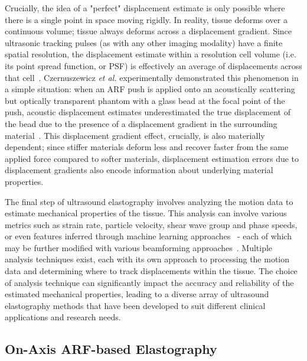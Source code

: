 Crucially, the idea of a "perfect" displacement estimate is only possible where there is a single point in space moving rigidly. In reality, tissue deforms over a continuous volume; tissue always deforms across a displacement gradient. Since ultrasonic tracking pulses (as with any other imaging modality) have a finite spatial resolution, the displacement estimate within a resolution cell volume (i.e. its point spread function, or PSF) is effectively an average of displacements across that cell~\cite{walker_fundamental_1995,mcaleavey_Estimates_2003,palmeri_Ultrasonic_2006}. Czernuszewicz \emph{et al.} experimentally demonstrated this phenomenon in a simple situation: when an ARF push is applied onto an acoustically scattering but optically transparent phantom with a glass bead at the focal point of the push, acoustic displacement estimates underestimated the true displacement of the bead due to the presence of a displacement gradient in the surrounding material~\cite{czernuszewicz_Experimental_2013}. This displacement gradient effect, crucially, is also materially dependent; since stiffer materials deform less and recover faster from the same applied force compared to softer materials, displacement estimation errors due to displacement gradients also encode information about underlying material properties.

The final step of ultrasound elastography involves analyzing the motion data to estimate mechanical properties of the tissue. This analysis can involve various metrics such as strain rate, particle velocity, shear wave group and phase speeds, or even features inferred through machine learning approaches~\cite{gennisson_Rheology_2014,wiseman_parametric_2020,jin_SweiNet_2022,chen_ShearWave_2023} - each of which may be further modified with various beamforming approaches~\cite{song_CombPush_2013,ahmed_PlaneWave_2018}. Multiple analysis techniques exist, each with its own approach to processing the motion data and determining where to track displacements within the tissue. The choice of analysis technique can significantly impact the accuracy and reliability of the estimated mechanical properties, leading to a diverse array of ultrasound elastography methods that have been developed to suit different clinical applications and research needs.

\subsection{On-Axis ARF-based Elastography}

